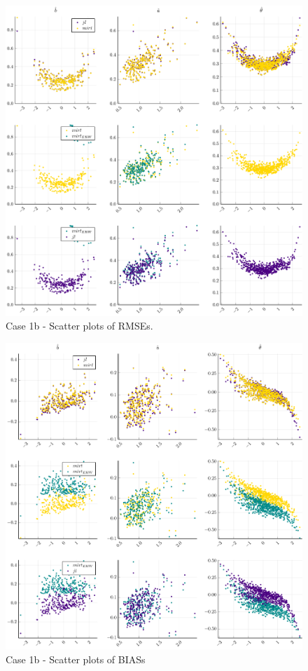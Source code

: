 \begin{figure}[ht]
	\centering
	\includegraphics[width=\textwidth]{Figures/1b/RMSEscatter.pdf}
	\caption{Case 1b - Scatter plots of RMSEs.}
	\label{fig:spRMSE1b}
\end{figure}
\begin{figure}[ht]
	\centering
	\includegraphics[width=\textwidth]{Figures/1b/BIASscatter.pdf}
	\caption{Case 1b - Scatter plots of BIASs }
	\label{fig:spBIAS1b}
\end{figure}
